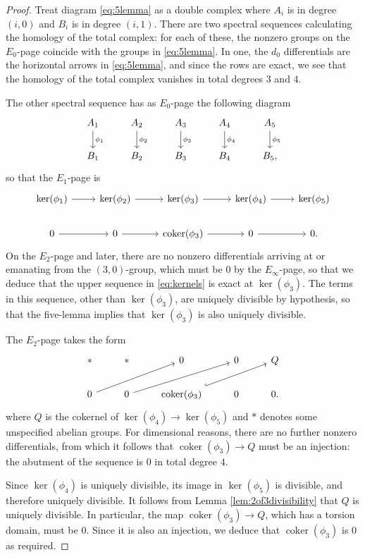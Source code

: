 \documentclass[11pt, oneside, dvipsnames, svgnames, table, final]{amsart}
\theoremstyle{plain}
\theoremstyle{definition}
\theoremstyle{remark}
\newcommand{\coker}{\operatorname{coker}}
\newcommand{\<}[1]{{\langle}#1 {\rangle}}
\begin{document}
\begin{proof}
  Treat diagram \eqref{eq:5lemma} as a double complex where $A_i$ is in degree $(i,0)$ and $B_i$ is in degree $(i,1)$. There are two spectral sequences calculating the homology of the total complex: for each of these, the nonzero groups on the $E_0$-page coincide with the groups in \eqref{eq:5lemma}. In one, the $d_0$ differentials are the horizontal arrows in \eqref{eq:5lemma}, and since the rows are exact, we see that the homology of the total complex vanishes in total degrees $3$ and $4$.

  The other spectral sequence has as $E_0$-page the following diagram
   \begin{equation*}
    \begin{tikzcd}
      A_1 \dar{\phi_1}  & A_2 \dar{\phi_2}  & A_3 \dar{\phi_3}  & A_4 \dar{\phi_4}  & A_5 \dar{\phi_5} \\
      B_1  & B_2  & B_3  & B_4 &  B_5,
    \end{tikzcd}
  \end{equation*}
  so that the $E_1$-page is
  \begin{equation}
    \begin{tikzcd}\label{eq:kernels}
      \ker(\phi_1) \rar & \ker(\phi_2) \rar & \ker(\phi_3) \rar & \ker(\phi_4) \rar & \ker(\phi_5) \\
      0 \rar & 0 \rar & \coker(\phi_3) \rar & 0 \rar  & 0.
    \end{tikzcd}
  \end{equation}
  On the $E_2$-page and later, there are no nonzero differentials arriving at or emanating from the $(3,0)$-group, which must be $0$ by the $E_\infty$-page, so that we deduce that the upper sequence in \eqref{eq:kernels} is exact at $\ker(\phi_3)$. The terms in this sequence, other than $\ker(\phi_3)$, are uniquely divisible by hypothesis, so that the five-lemma implies that $\ker(\phi_3)$ is also uniquely divisible.

  The $E_2$-page takes the form
  \[
  \begin{tikzcd}\label{eq:E2}
     \ast  & \ast   & 0  & 0  & Q \\
      0 \arrow[urr] & 0 \arrow[urr] & \coker(\phi_3) \arrow[urr, hook]  & 0   & 0.
    \end{tikzcd} 
  \]
  where $Q$ is the cokernel of $\ker(\phi_4) \to \ker(\phi_5)$ and $\ast$ denotes some unspecified abelian groups. For dimensional reasons, there are no further nonzero differentials, from which it follows that $\coker(\phi_3) \to Q$ must be an injection: the abutment of the sequence is $0$ in total degree $4$.

  Since $\ker(\phi_4)$ is uniquely divisible, its image in $\ker(\phi_5)$ is divisible, and therefore uniquely divisible. It follows from Lemma \ref{lem:2of3divisibility} that $Q$ is uniquely divisible. In particular, the map $\coker(\phi_3) \to Q$, which has a torsion domain, must be $0$. Since it is also an injection, we deduce that $\coker(\phi_3)$ is $0$ as required.
\end{proof}




\printbibliography
\end{document}
